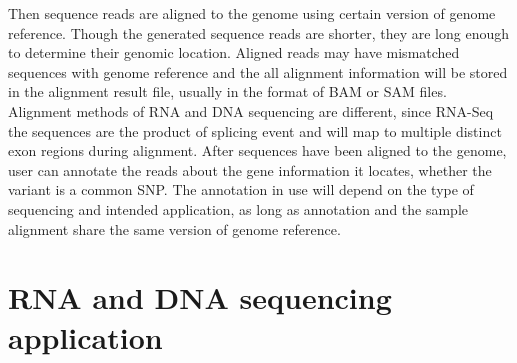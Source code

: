 Then sequence reads are aligned to the genome using certain version of genome
reference. Though the generated sequence reads are shorter, they are long
enough to determine their genomic location. Aligned reads may have mismatched
sequences with genome reference and the all alignment information will be
stored in the alignment result file, usually in the format of BAM or SAM files.
Alignment methods of RNA and DNA sequencing are different, since RNA-Seq the
sequences are the product of splicing event and will map to multiple distinct
exon regions during alignment. After sequences have been aligned to the genome,
user can annotate the reads about the gene information it locates, whether the
variant is a common SNP. The annotation in use will depend on the type of
sequencing and intended application, as long as annotation and the sample
alignment share the same version of genome reference.


\section{RNA and DNA sequencing application}
\label{s:rna-dna-seq-app}


%


